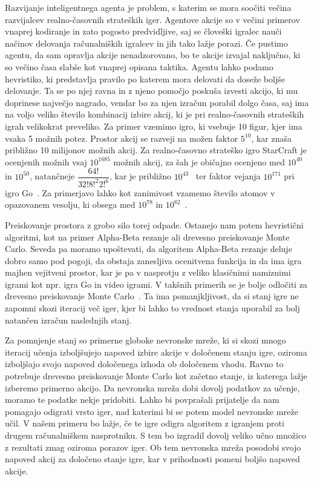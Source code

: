 \documentclass[a4paper, 12pt]{book}
\begin{document}
Razvijanje inteligentnega agenta je problem, s katerim se mora soočiti večina razvijalcev realno-časovnih strateških iger. 
Agentove akcije so v večini primerov vnaprej kodiranje in zato pogosto predvidljive, saj se človeški igralec nauči načinov delovanja računalniških igralcev in jih tako lažje porazi.
Če pustimo agentu, da sam opravlja akcije nenadzorovano, bo te akcije izvajal naključno, ki so večino časa slabše kot vnaprej opisana taktika.
Agentu lahko podamo hevristiko, ki predstavlja pravilo po katerem mora delovati da doseže boljše delovanje.
Ta se po njej ravna in z njeno pomočjo poskuša izvesti akcijo, ki mu doprinese največjo nagrado, vendar bo za njen izračun porabil dolgo časa, saj ima na voljo veliko število kombinacij izbire akcij, ki je pri realno-časovnih strateških igrah velikokrat preveliko.
Za primer vzemimo igro, ki vsebuje 10 figur, kjer ima vsaka 5 možnih potez.
Prostor akcij se razveji na možen faktor $5^{10}$, kar znaša približno 10 milijonov možnih akcij.
Za realno-časovno strateško igro StarCraft je ocenjenih možnih vsaj $10^{1685}$ možnih akcij, za šah je običajno ocenjeno med $10^{40}$ in $10^{50}$, natančneje $\dfrac{64!}{32!8!^{2}2!^{6}}$, kar je približno $10^{43}$~\cite{wiki:Shannon_number} ter faktor vejanja $10^{171}$ pri igro Go~\cite{ontanon2017combinatorial}.
Za primerjavo lahko kot zanimivost vzamemo število atomov v opazovanem vesolju, ki obsega med $10^{78}$ in $10^{82}$~\cite{atoms}.

Preiskovanje prostora z grobo silo torej odpade. 
Ostanejo nam potem hevristični algoritmi, kot na primer Alpha-Beta rezanje ali drevesno preiskovanje Monte Carlo. 
Seveda pa moramo upoštevati, da algoritem Alpha-Beta rezanje deluje dobro samo pod pogoji, da obstaja zanesljiva ocenitvena funkcija in da ima igra majhen vejitveni prostor, kar je pa v nasprotju z veliko klasičnimi namiznimi igrami kot npr. igra Go in video igrami. 
V takšnih primerih se je bolje odločiti za drevesno preiskovanje Monte Carlo~\cite{chaslot2008monte}.
Ta ima pomanjkljivost, da si stanj igre ne zapomni skozi iteracij več iger, kjer bi lahko to vrednost stanja uporabil za bolj natančen izračun naslednjih stanj.

Za pomnjenje stanj so primerne globoke nevronske mreže, ki si skozi mnogo iteracij učenja izboljšujejo napoved izbire akcije v določenem stanju igre, oziroma izboljšajo svojo napoved določenega izhoda ob določenem vhodu.
Ravno to potrebuje drevesno preiskovanje Monte Carlo kot začetno stanje, iz katerega lažje izberemo primerno akcijo.
Da nevronska mreža dobi dovolj podatkov za učenje, moramo te podatke nekje pridobiti.
Lahko bi povprašali prijatelje da nam pomagajo odigrati vrsto iger, nad katerimi bi se potem model nevronske mreže učil.
V našem primeru bo lažje, če te igre odigra algoritem z igranjem proti drugem računalniškem nasprotniku.
S tem bo izgradil dovolj veliko učno množico z rezultati zmag oziroma porazov iger. 
Ob tem nevronska mreža posodobi svojo napoved akcij za določeno stanje igre, kar v prihodnosti pomeni boljšo napoved akcije.
\end{document}
